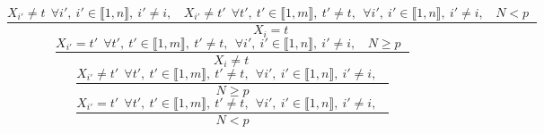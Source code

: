 $$\frac{X_{i'} \neq t~~\forall i',~i' \in \llbracket1,n\rrbracket,~i' \neq i,~~~~X_{i'} \neq t'~~\forall t',~t' \in \llbracket1,m\rrbracket,~t' \neq t,~~\forall i',~i' \in \llbracket1,n\rrbracket,~i' \neq i,~~~~N<p ~~~}{X_{i}=t~}$$ $$\frac{X_{i'}=t'~~\forall t',~t' \in \llbracket1,m\rrbracket,~t' \neq t,~~\forall i',~i' \in \llbracket1,n\rrbracket,~i' \neq i,~~~~N \geq p ~~~}{X_{i} \neq t~}$$ $$\frac{X_{i'} \neq t'~~\forall t',~t' \in \llbracket1,m\rrbracket,~t' \neq t,~~\forall i',~i' \in \llbracket1,n\rrbracket,~i' \neq i,~~~~}{N \geq p }$$ $$\frac{X_{i'}=t'~~\forall t',~t' \in \llbracket1,m\rrbracket,~t' \neq t,~~\forall i',~i' \in \llbracket1,n\rrbracket,~i' \neq i,~~~~}{N<p }$$ 